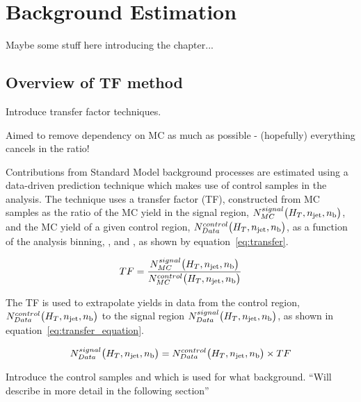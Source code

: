 \chapter{Background Estimation}
\label{ch:6}

\ifpdf
    \graphicspath{{Chapter6/Figs/Raster/}{Chapter6/Figs/PDF/}{Chapter6/Figs/}}
\else
    \graphicspath{{Chapter6/Figs/Vector/}{Chapter6/Figs/}}
\fi

Maybe some stuff here introducing the chapter...

\section{Overview of TF method}  %
\label{sec:background_overview}
Introduce transfer factor techniques.

Aimed to remove dependency on MC as much as possible - (hopefully) everything cancels in 
the ratio!

Contributions from Standard Model background processes are estimated using a data-driven 
prediction technique which makes use of control samples in the analysis. The 
technique uses a transfer factor (TF), constructed from MC samples as the ratio 
of the MC yield in the signal region, $N_{MC}^{signal}\big(H_T, n_{\text{jet}}, n_{\text{b}}\big)$,
and the MC yield of a given control region, $N_{Data}^{control}\big(H_T, n_{\text{jet}}, n_{\text{b}}\big)$,
as a function of the analysis binning, \HT, \nj and \nb, as shown by
equation~\ref{eq:transfer}.

\begin{equation}
TF = \frac{N_{MC}^{signal}\big(H_T, n_{\text{jet}}, n_{\text{b}}\big)}{N_{MC}^{control}\big(H_T, n_{\text{jet}}, n_{\text{b}}\big)}
\label{eq:transfer_factor}
\end{equation}

The TF is used to extrapolate yields in data from the control region, $N_{Data}^{control}\big(H_T, n_{\text{jet}}, n_{\text{b}}\big)$
to the signal region $N_{Data}^{signal}\big(H_T, n_{\text{jet}}, n_{\text{b}}\big)$, as shown in
equation~\ref{eq:transfer_equation}.

\begin{equation}
N_{Data}^{signal}\big(H_T, n_{\text{jet}}, n_{\text{b}}\big) = N_{Data}^{control}\big(H_T, n_{\text{jet}}, n_{\text{b}}\big)
\times TF
\label{eq:transfer_equation}
\end{equation}


Introduce the control samples and which is used for what background. ``Will 
describe in more detail in the following section''


